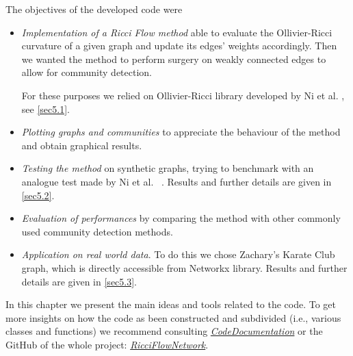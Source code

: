 The objectives of the developed code were
\begin{itemize}
    \item \emph{Implementation of a Ricci Flow method} able to evaluate the Ollivier-Ricci curvature of a given graph and update its edges' weights accordingly. Then we wanted the method to perform surgery on weakly connected edges to allow for community detection.
    
    For these purposes we relied on Ollivier-Ricci library developed by Ni et al. \cite{Ollivier-RicciLib}, see \autoref{sec5.1}.
    
    \item \emph{Plotting graphs and communities} to appreciate the behaviour of the method and obtain graphical results.
    
    \item \emph{Testing the method} on synthetic graphs, trying to benchmark with an analogue test made by Ni et al. ~\cite{Ni:communitydetectionnetworksricci}. Results and further details are given in \autoref{sec5.2}.
    
    \item \emph{Evaluation of performances} by comparing the method with other commonly used community detection methods.  
    
    \item \emph{Application on real world data}. To do this we chose Zachary's Karate Club graph, which is directly accessible from Networkx library. Results and further details are given in \autoref{sec5.3}.
    
\end{itemize}

In this chapter we present the main ideas and tools related to the code. To get more insights on how the code as been constructed and subdivided (i.e., various classes and functions) we recommend consulting \textit{\href{https://fancy-dodol-4d2c6d.netlify.app/}{CodeDocumentation}} or the GitHub of the whole project: \textit{\href{https://github.com/fabbri-lorenzo/RicciFlowNetwork}{RicciFlowNetwork}}.
